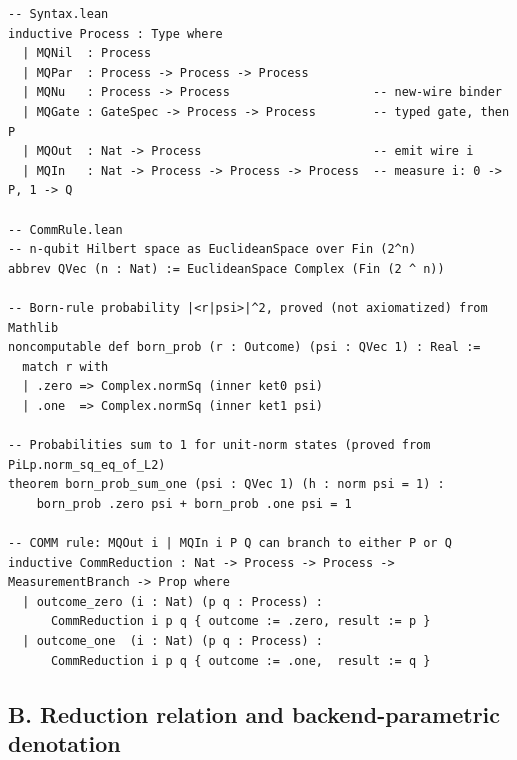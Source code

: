 \documentclass[11pt]{article}
\begin{document}
\begin{lstlisting}[language={},caption={Process grammar (\texttt{Syntax.lean}) and COMM rule (\texttt{CommRule.lean})}]
-- Syntax.lean
inductive Process : Type where
  | MQNil  : Process
  | MQPar  : Process -> Process -> Process
  | MQNu   : Process -> Process                    -- new-wire binder
  | MQGate : GateSpec -> Process -> Process        -- typed gate, then P
  | MQOut  : Nat -> Process                        -- emit wire i
  | MQIn   : Nat -> Process -> Process -> Process  -- measure i: 0 -> P, 1 -> Q

-- CommRule.lean
-- n-qubit Hilbert space as EuclideanSpace over Fin (2^n)
abbrev QVec (n : Nat) := EuclideanSpace Complex (Fin (2 ^ n))

-- Born-rule probability |<r|psi>|^2, proved (not axiomatized) from Mathlib
noncomputable def born_prob (r : Outcome) (psi : QVec 1) : Real :=
  match r with
  | .zero => Complex.normSq (inner ket0 psi)
  | .one  => Complex.normSq (inner ket1 psi)

-- Probabilities sum to 1 for unit-norm states (proved from PiLp.norm_sq_eq_of_L2)
theorem born_prob_sum_one (psi : QVec 1) (h : norm psi = 1) :
    born_prob .zero psi + born_prob .one psi = 1

-- COMM rule: MQOut i | MQIn i P Q can branch to either P or Q
inductive CommReduction : Nat -> Process -> Process -> MeasurementBranch -> Prop where
  | outcome_zero (i : Nat) (p q : Process) :
      CommReduction i p q { outcome := .zero, result := p }
  | outcome_one  (i : Nat) (p q : Process) :
      CommReduction i p q { outcome := .one,  result := q }
\end{lstlisting}

\subsection*{B. Reduction relation and backend-parametric denotation}
\end{document}
